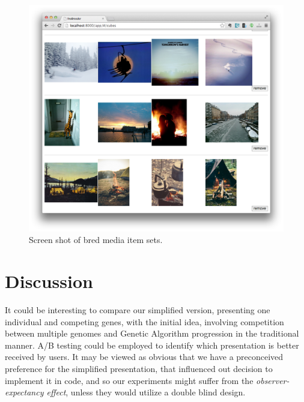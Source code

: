 \documentclass[conference]{IEEETran}
\begin{document}
\begin{figure}[htp]
	\centerline{\includegraphics[width=\columnwidth]{bredLikeCubes.png}}
	\caption{Screen shot of bred media item sets.}
	\label{fig:bredLikeCubes}
\end{figure}





\section{Discussion}
\label{sec:Discussion}

It could be interesting to compare our simplified version, presenting one individual and competing genes, with the initial idea, involving competition between multiple genomes and Genetic Algorithm progression in the traditional manner.  A/B testing could be employed to identify which presentation is better received by users.  It may be viewed as obvious that we have a preconceived preference for the simplified presentation, that influenced out decision to implement it in code, and so our experiments might suffer from the \textit{observer-expectancy effect}, unless they would utilize a double blind design.

\end{document}

